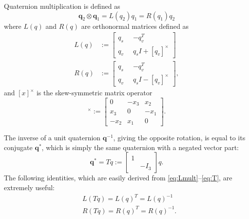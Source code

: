 \documentclass[letterpaper, 10 pt, conference]{ieeeconf}  %
\newcommand{\skewmat}[1]{[#1]^\times}
\newcommand{\q}{\textbf{q}}
\begin{document}
        Quaternion multiplication is defined as
        \begin{equation} \label{eq:quat_mult}
            \q_2 \otimes \q_1 = L(q_2) q_1 = R(q_1) q_2
        \end{equation}
        where $L(q)$ and $R(q)$ are orthonormal matrices defined as
        \begin{align}
            L(q) &:= \begin{bmatrix} 
                q_s \;\; & -q_v^T \\ 
                q_v \;\; & q_s I + \skewmat{q_v} 
            \end{bmatrix} 
            \label{eq:Lmult} \\
            R(q) &:=\begin{bmatrix} 
                q_s \;\; & -q_v^T \\ 
                q_v \;\; & q_s I - \skewmat{q_v} 
            \end{bmatrix} \label{eq:Rmult},
        \end{align}
        and $\skewmat{x}$ is the skew-symmetric matrix operator
        \begin{equation}
            \skewmat{x} := \begin{bmatrix} 
                0 & -x_3 & x_2 \\ 
                x_3 & 0 & -x_1\\ 
                -x_2 & x_1 & 0 
            \end{bmatrix}.
        \end{equation}
        
        The inverse of a unit quaternion $\q^{-1}$, giving the opposite rotation, is equal 
        to its conjugate $\q^*$, which is simply the same quaternion with a negated vector 
        part:
        \begin{equation} \label{eq:T}
            \q^* = T q := \begin{bmatrix} 
                1 & \\ 
                & -I_3 
            \end{bmatrix} q.
        \end{equation}
        The following identities, which are easily derived from
        \eqref{eq:Lmult}--\eqref{eq:T}, are extremely useful:
        \begin{align}
            &L(Tq) = L(q)^T = L(q)^{-1} \\
            &R(Tq) = R(q)^T = R(q)^{-1} .
        \end{align}
        
\end{document}
